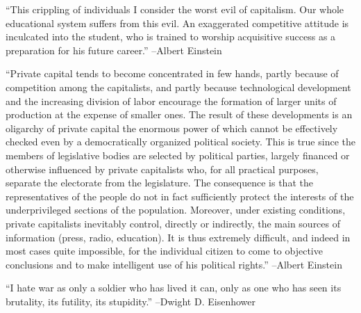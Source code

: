\documentclass{article}%
\begin{document}
\linebreak%
\vspace{1mm}%
\begin{minipage}{\textwidth}%
\flushleft%
“This crippling of individuals I consider the worst evil of capitalism. Our whole educational system suffers from this evil. An exaggerated competitive attitude is inculcated into the student, who is trained to worship acquisitive success as a preparation for his future career.”%
\linebreak%
\vspace{1mm}%
–Albert Einstein%
\linebreak%
\vspace{1mm}%
\end{minipage}%
\linebreak%
\vspace{1mm}%
\begin{minipage}{\textwidth}%
\flushleft%
“Private capital tends to become concentrated in few hands, partly because of competition among the capitalists, and partly because technological development and the increasing division of labor encourage the formation of larger units of production at the expense of smaller ones. The result of these developments is an oligarchy of private capital the enormous power of which cannot be effectively checked even by a democratically organized political society. This is true since the members of legislative bodies are selected by political parties, largely financed or otherwise influenced by private capitalists who, for all practical purposes, separate the electorate from the legislature. The consequence is that the representatives of the people do not in fact sufficiently protect the interests of the underprivileged sections of the population. Moreover, under existing conditions, private capitalists inevitably control, directly or indirectly, the main sources of information (press, radio, education). It is thus extremely difficult, and indeed in most cases quite impossible, for the individual citizen to come to objective conclusions and to make intelligent use of his political rights.”%
\linebreak%
\vspace{1mm}%
–Albert Einstein%
\linebreak%
\vspace{1mm}%
\end{minipage}%
\linebreak%
\vspace{1mm}%
\begin{minipage}{\textwidth}%
\flushleft%
“I hate war as only a soldier who has lived it can, only as one who has seen its brutality, its futility, its stupidity.”%
\linebreak%
\vspace{1mm}%
–Dwight D. Eisenhower%
\linebreak%
\vspace{1mm}%
\end{minipage}%
\end{document}
